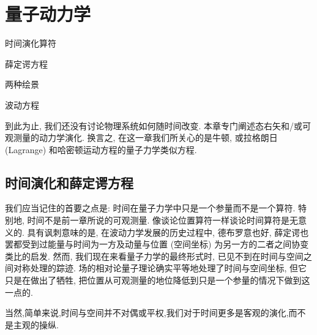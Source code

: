 \ifx\allfiles\undefined



	\else
	\fi
\chapter{量子动力学}
\begin{introduction}
	\item 时间演化算符
	\item 薛定谔方程
	\item 两种绘景
	\item 波动方程
\end{introduction}
到此为止, 我们还没有讨论物理系统如何随时间改变. 本章专门阐述态右矢和/或可观测量的动力学演化. 换言之, 在这一章我们所关心的是牛顿, 或拉格朗日 (Lagrange) 和哈密顿运动方程的量子力学类似方程.

\section{时间演化和薛定谔方程}
我们应当记住的首要之点是: 时间在量子力学中只是一个参量而不是一个算符. 特别地, 时间不是前一章所说的可观测量. 像谈论位置算符一样谈论时间算符是无意义的. 具有讽刺意味的是, 在波动力学发展的历史过程中, 德布罗意也好, 薛定谔也罢都受到过能量与时间为一方及动量与位置 (空间坐标) 为另一方的二者之间协变类比的启发. 然而, 我们现在来看量子力学的最终形式时, 已见不到在时间与空间之间对称处理的踪迹. 场的相对论量子理论确实平等地处理了时间与空间坐标, 但它只是在做出了牺牲, 把位置从可观测量的地位降低到只是一个参量的情况下做到这一点的.

当然,简单来说,时间与空间并不对偶或平权,我们对于时间更多是客观的演化,而不是主观的操纵.
